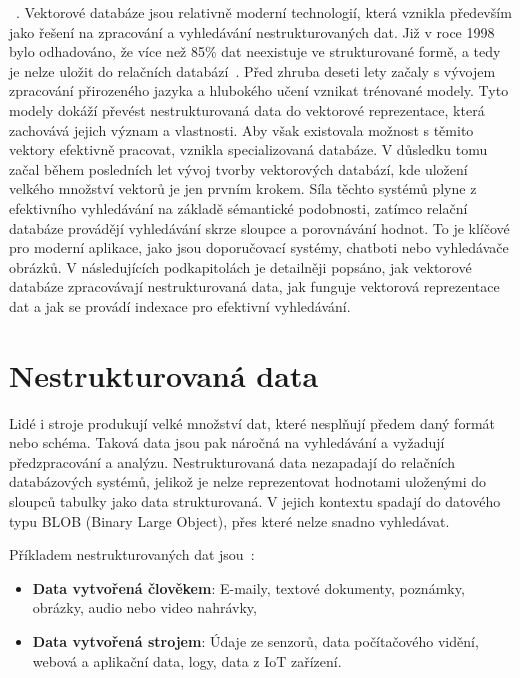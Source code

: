 ~\cite{compreh_survey_vdb}. Vektorové databáze jsou relativně moderní technologií, která vznikla především jako řešení na zpracování a vyhledávání nestrukturovaných dat. Již v roce 1998 bylo odhadováno, že více než 85\% dat neexistuje ve strukturované formě, a tedy je nelze uložit do relačních databází~\cite{problem_with_unstructured}. Před zhruba deseti lety začaly s vývojem zpracování přirozeného jazyka a hlubokého učení vznikat trénované modely. Tyto modely dokáží převést nestrukturovaná data do vektorové reprezentace, která zachovává jejich význam a vlastnosti. Aby však existovala možnost s těmito vektory efektivně pracovat, vznikla specializovaná databáze. V důsledku tomu začal během posledních let vývoj tvorby vektorových databází, kde uložení velkého množství vektorů je jen prvním krokem. Síla těchto systémů plyne z efektivního vyhledávání na základě sémantické podobnosti, zatímco relační databáze provádějí vyhledávání skrze sloupce a porovnávání hodnot. To je klíčové pro moderní aplikace, jako jsou doporučovací systémy, chatboti nebo vyhledávače obrázků. V následujících podkapitolách je detailněji popsáno, jak vektorové databáze zpracovávají nestrukturovaná data, jak funguje vektorová reprezentace dat a jak se provádí indexace pro efektivní vyhledávání.

\section{Nestrukturovaná data}
Lidé i stroje produkují velké množství dat, které nesplňují předem daný formát nebo schéma. Taková data jsou pak náročná na vyhledávání a vyžadují předzpracování a analýzu. Nestrukturovaná data nezapadají do relačních databázových systémů, jelikož je nelze reprezentovat hodnotami uloženými do sloupců tabulky jako data strukturovaná. V jejich kontextu spadají do datového typu BLOB (Binary Large Object), přes které nelze snadno vyhledávat. 

Příkladem nestrukturovaných dat jsou~\cite{zilliz_unstructured_data}:
\begin{itemize}
    \item \textbf{Data vytvořená člověkem}: E-maily, textové dokumenty, poznámky, obrázky, audio nebo video nahrávky,
    \item \textbf{Data vytvořená strojem}: Údaje ze senzorů, data počítačového vidění, webová a aplikační data, logy, data z IoT zařízení.
\end{itemize} 

